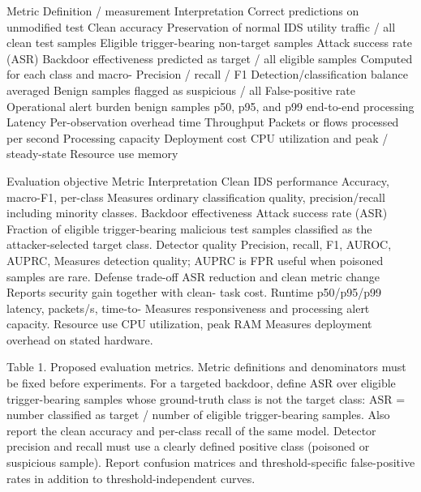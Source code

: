 \documentclass[11pt]{article}
\begin{document}
Metric                                      Definition / measurement                      Interpretation Correct predictions on unmodified test Clean accuracy                                                                            Preservation of normal IDS utility traffic / all clean test samples Eligible trigger-bearing non-target samples Attack success rate (ASR)                                                                 Backdoor effectiveness predicted as target / all eligible samples Computed for each class and macro- Precision / recall / F1                                                                   Detection/classification balance averaged Benign samples flagged as suspicious / all False-positive rate                                                                       Operational alert burden benign samples p50, p95, and p99 end-to-end processing Latency                                                                                   Per-observation overhead time Throughput                                  Packets or flows processed per second         Processing capacity Deployment cost CPU utilization and peak / steady-state Resource use memory

Evaluation objective                    Metric                                     Interpretation Clean IDS performance                   Accuracy, macro-F1, per-class              Measures ordinary classification quality, precision/recall                           including minority classes. Backdoor effectiveness                  Attack success rate (ASR)                  Fraction of eligible trigger-bearing malicious test samples classified as the attacker-selected target class. Detector quality                        Precision, recall, F1, AUROC, AUPRC,       Measures detection quality; AUPRC is FPR                                        useful when poisoned samples are rare. Defense trade-off                       ASR reduction and clean metric change      Reports security gain together with clean- task cost. Runtime                                 p50/p95/p99 latency, packets/s, time-to-   Measures responsiveness and processing alert                                      capacity. Resource use                            CPU utilization, peak RAM                  Measures deployment overhead on stated hardware.

Table 1. Proposed evaluation metrics. Metric definitions and denominators must be fixed before experiments. For a targeted backdoor, define ASR over eligible trigger-bearing samples whose ground-truth class is not the target class: ASR = number classified as target / number of eligible trigger-bearing samples. Also report the clean accuracy and per-class recall of the same model. Detector precision and recall must use a clearly defined positive class (poisoned or suspicious sample). Report confusion matrices and threshold-specific false-positive rates in addition to threshold-independent curves.
\end{document}
